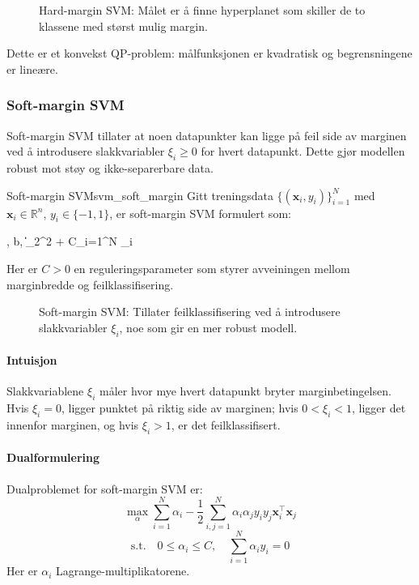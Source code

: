 \begin{figure}[htbp]
	\centering
	
	\caption{Hard-margin SVM: Målet er å finne hyperplanet som skiller de to klassene med størst mulig margin.}
	\label{fig:hard_margin_svm}
\end{figure}

Dette er et konvekst QP-problem: målfunksjonen er kvadratisk og begrensningene er lineære.


\subsubsection{Soft-margin SVM}
Soft-margin SVM tillater at noen datapunkter kan ligge på feil side av marginen ved å introdusere slakkvariabler $\xi_i \ge 0$ for hvert datapunkt. Dette gjør modellen robust mot støy og ikke-separerbare data.

\begin{definition}{Soft-margin SVM}{svm_soft_margin}
	Gitt treningsdata $\{(\symbf{x}_i, y_i)\}_{i=1}^N$ med $\symbf{x}_i \in \mathbb{R}^n$, $y_i \in \{-1,1\}$, er soft-margin SVM formulert som:
	\begin{mini*}
		{, b, \xi}{\|\|_2^2 + C\sum_{i=1}^N \xi_i}{}{}
	\end{mini*}
	Her er $C > 0$ en reguleringsparameter som styrer avveiningen mellom marginbredde og feilklassifisering.
\end{definition}
\begin{figure}[htbp]
	\centering
	
	\caption{Soft-margin SVM: Tillater feilklassifisering ved å introdusere slakkvariabler $\xi_i$, noe som gir en mer robust modell.}
	\label{fig:soft_margin_svm}
\end{figure}

\paragraph{Intuisjon}
Slakkvariablene $\xi_i$ måler hvor mye hvert datapunkt bryter marginbetingelsen. Hvis $\xi_i = 0$, ligger punktet på riktig side av marginen; hvis $0 < \xi_i < 1$, ligger det innenfor marginen, og hvis $\xi_i > 1$, er det feilklassifisert.

\paragraph{Dualformulering}
Dualproblemet for soft-margin SVM er:
\[
	\max_{\alpha} \sum_{i=1}^N \alpha_i - \frac{1}{2}\sum_{i,j=1}^N \alpha_i \alpha_j y_i y_j \symbf{x}_i^\top \symbf{x}_j
\]
\[
	\text{s.t.} \quad 0 \leq \alpha_i \leq C, \quad \sum_{i=1}^N \alpha_i y_i = 0
\]
Her er $\alpha_i$ Lagrange-multiplikatorene.

